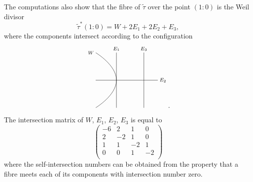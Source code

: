 \documentclass[12pt,reqno]{amsart}
\theoremstyle{definition}
\newcommand{\wt}{\widetilde}
\begin{document}
The computations also show that the fibre of $\wt \tau$ over the point $(1:0)$ is the Weil divisor
\begin{equation}\label{2024_07_22_13:30}
    \wt \tau^* (1:0) = W + 2 E_1 + 2 E_2 + E_3,
\end{equation}
where the components intersect according to the configuration
\[
\begin{scriptsize}
\begin{tikzpicture}[line cap=round,line join=round,x=0.7cm,y=0.7cm]
\draw plot [smooth,tension=1] coordinates {(-1.5,-2) (0,0) (-1.5,2)}; \draw (-1.5,2) node[left] {$W$};
\draw (-1.5,0) -- (3,0) node[right] {$E_2$};
\draw (0,-2) -- (0,2) node[above] {$E_1$};
\draw (2,-2) -- (2,2) node[above] {$E_3$};

\end{tikzpicture}
\end{scriptsize}.
\]
The intersection matrix of $W$, $E_1$, $E_2$, $E_3$ is equal to
\[ \left( \begin{array}{cccc} 
-6 & 2 & 1 & 0  \\
2 & -2 & 1 & 0 \\
1 & 1 & -2 & 1 \\
0 & 0 & 1 & -2 \\
\end{array} \right) \]
where the self-intersection numbers can be obtained from the property that a fibre meets each of its components with intersection number zero.
\end{document}
